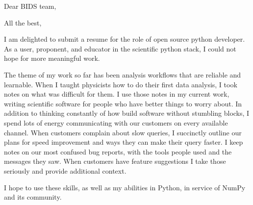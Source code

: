 \documentclass[11pt,a4paper,sans]{moderncv}        %
\begin{document}
\recipient{~}{~}
\date{\today}
\opening{Dear BIDS team,}
\closing{All the best,}
\makelettertitle

I am delighted to submit a resume for the role of open source python developer.
As a user, proponent, and educator in the scientific python stack, I could not hope for more meaningful work.

The theme of my work so far has been analysis workflows that are reliable and learnable.
When I taught physicists how to do their first data analysis, I took notes on what was difficult for them.
I use those notes in my current work, writing scientific software for people who have better things to worry about.
In addition to thinking constantly of how build software without stumbling blocks, I spend lots of energy communicating with our customers on every available channel.
When customers complain about slow queries, I succinctly outline our plans for speed improvement and ways they can make their query faster.
I keep notes on our most confused bug reports, with the tools people used and the messages they saw.
When customers have feature suggestions I take those seriously and provide additional context.

I hope to use these skills, as well as my abilities in Python, in service of NumPy and its community.

\makeletterclosing
\end{document}
